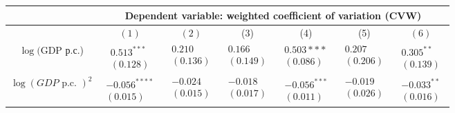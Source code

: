 \documentclass[10pt]{article}
\begin{document}
\begin{center}
\begin{tabular}{|c|c|c|c|c|c|c|}
\hline
 & \multicolumn{6}{|c|}{Dependent variable: weighted coefficient of variation (CVW)} \\
\hline
 & $(1)$ & $(2)$ & (3) & (4) & (5) & $(6)$ \\
\hline
$\log (\mathrm{GDP}$ р.с.) & $\begin{array}{l}0.513^{* * *} \\ (0.128)\end{array}$ & $\begin{array}{l}0.210 \\ (0.136)\end{array}$ & $\begin{array}{l}0.166 \\ (0.149)\end{array}$ & $\begin{array}{l}0.503 * * * \\ (0.086)\end{array}$ & $\begin{array}{l}0.207 \\ (0.206)\end{array}$ & $\begin{array}{l}0.305^{* *} \\ (0.139)\end{array}$ \\
\hline
$\log (G D P \text { p.c. })^{2}$ & $\begin{array}{l}-0.056^{* * * *} \\ (0.015)\end{array}$ & $\begin{array}{l}-0.024 \\ (0.015)\end{array}$ & $\begin{array}{l}-0.018 \\ (0.017)\end{array}$ & $\begin{array}{l}-0.056^{* * *} \\ (0.011)\end{array}$ & $\begin{array}{l}-0.019 \\ (0.026)\end{array}$ & $\begin{array}{l}-0.033^{* *} \\ (0.016)\end{array}$ \\
\hline

\end{tabular}
\end{center}
\end{document}
